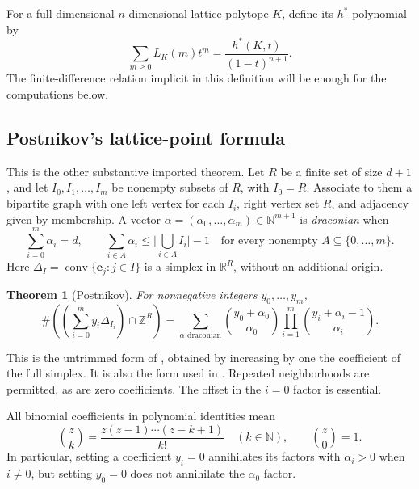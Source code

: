 \documentclass[11pt,letterpaper]{article}
\newtheorem{theorem}{Theorem}[section]
\theoremstyle{definition}
\newcommand{\N}{\mathbb N}
\newcommand{\Z}{\mathbb Z}
\newcommand{\R}{\mathbb R}
\DeclareMathOperator{\conv}{conv}
\newcommand{\card}[1]{\lvert #1\rvert}
\begin{document}
For a full-dimensional $n$-dimensional lattice polytope $K$, define its
$h^*$-polynomial by
\begin{equation}\label{eq:hstar-def}
 \sum_{m\geq0}L_K(m)t^m=\frac{h^*(K,t)}{(1-t)^{n+1}}.
\end{equation}
The finite-difference relation implicit in this definition will be enough
for the computations below.

\subsection{Postnikov's lattice-point formula}
This is the other substantive imported theorem. Let $R$ be a finite set of
size $d+1$, and let $I_0,I_1,\ldots,I_m$ be nonempty subsets of $R$, with
$I_0=R$. Associate to them a bipartite graph with one left vertex for each
$I_i$, right vertex set $R$, and adjacency given by membership. A vector
$\alpha=(\alpha_0,\ldots,\alpha_m)\in\N^{m+1}$ is \emph{draconian} when
\begin{equation}\label{eq:draconian}
 \sum_{i=0}^m\alpha_i=d,\qquad
 \sum_{i\in A}\alpha_i\leq\card{\bigcup_{i\in A}I_i}-1
 \quad\text{for every nonempty }A\subseteq\{0,\ldots,m\}.
\end{equation}
Here $\Delta_I=\conv\{\mathbf e_j:j\in I\}$ is a simplex in
$\R^R$, without an additional origin.

\begin{theorem}[Postnikov]\label{thm:Postnikov}
For nonnegative integers $y_0,\ldots,y_m$,
\begin{equation}\label{eq:Postnikov}
 \#\left(\left(\sum_{i=0}^m y_i\Delta_{I_i}\right)\cap\Z^R\right)
 =\sum_{\alpha\text{ draconian}}
     \binom{y_0+\alpha_0}{\alpha_0}
     \prod_{i=1}^m\binom{y_i+\alpha_i-1}{\alpha_i}.
\end{equation}
\end{theorem}
This is the untrimmed form of \cite[Theorem~11.3]{Postnikov09}, obtained by
increasing by one the coefficient of the full simplex. It is also the form
used in \cite[Theorem~2.1]{AC26}. Repeated neighborhoods are permitted, as are
zero coefficients. The offset in the $i=0$ factor is essential.

All binomial coefficients in polynomial identities mean
\begin{equation}\label{eq:polynomial-binom}
 \binom zk=\frac{z(z-1)\cdots(z-k+1)}{k!}\quad(k\in\N),\qquad
 \binom z0=1.
\end{equation}
In particular, setting a coefficient $y_i=0$ annihilates its factors with
$\alpha_i>0$ when $i\ne0$, but setting $y_0=0$ does not annihilate the
$\alpha_0$ factor.
\end{document}
